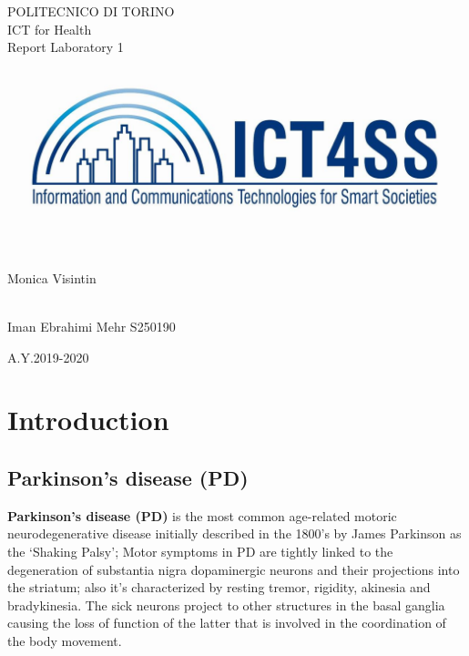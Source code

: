 \documentclass[a4paper,12pt,oneside,titlepage]{article}
\begin{document}
	
	\thispagestyle{empty}
	\setcounter{page}{0}
	
	\begin{center}
		\huge
		POLITECNICO DI TORINO\\[1.cm]
		\Large
		ICT for Health \\
		\vspace{0.5cm}
		\Large
		Report Laboratory 1\\[1.3cm]
		
		\vspace{0.5cm}
		\includegraphics[scale=2]{logo.jpg}
	\end{center}
	\vspace{1.cm}
	
	\begin{flushleft}
		\Large
		\\
		Monica Visintin\\[0.2cm]
	\end{flushleft}
	\vspace{1cm}
	
	
	\begin{flushright} 
		\Large
		\\
		Iman Ebrahimi Mehr S250190\\[0.2cm]
	\end{flushright} 
	\vspace{2cm}
	\begin{center}
		\Large
		A.Y.2019-2020
	\end{center}
	
	\newpage
	\thispagestyle{empty}
	\tableofcontents
	
	
	\newpage
	\section{Introduction}
	\subsection{\textbf{Parkinson’s disease (PD)}}
	\textbf{Parkinson’s disease (PD)} is the most common age-related motoric neurodegenerative disease initially described in the 1800’s by James Parkinson as the ‘Shaking Palsy’; Motor symptoms in PD are tightly linked to the degeneration of substantia nigra dopaminergic neurons and their projections into the striatum; also it’s characterized by resting tremor, rigidity, akinesia and bradykinesia. The sick neurons project to other structures in the basal ganglia causing the loss of function of the latter that is involved in the coordination of the body movement.
	
\end{document}
